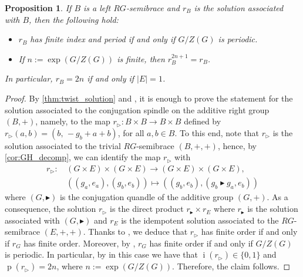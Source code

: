 \documentclass[11pt]{amsart}
\DeclareMathOperator{\ind}{i}
\DeclareMathOperator{\per}{p}
\newcommand{\indd}[1]{\ind{#1}}
\newcommand{\perr}[1]{\per{#1}}
\newtheorem{proposition}[theorem]{Proposition}
\theoremstyle{definition}
\begin{document}
\begin{proposition}
    If $B$ is a left $RG$-semibrace and $r_B$ is the solution associated with $B$, then the following hold:
    \begin{itemize}
        \item[{\rm(1)}] $r_B$ has finite index and period if and only if $G/Z(G)$ is periodic.
        \item[{\rm(2)}] If $n := \exp(G/Z(G))$ is finite, then $r_B^{2n + 1} = r_B$.
    \end{itemize}
    In particular, $r_B = 2n$ if and only if $|E| = 1$.
    \end{proposition}
\begin{proof}
    By \cref{thm:twist_solution} and \cite[Lemma 2.12]{DoRySte24}, it is enough to prove the statement for the solution associated to the conjugation spindle on the additive right group $(B,+)$, namely, to the map $r_\triangleright:B\times B\to B\times B$ defined by $r_\triangleright(a,b) = (b,\, - g_b + a+b)$, for all $a,b\in B$.
    To this end, note that $r_\triangleright$ is the solution associated to the trivial $RG$-semibrace $(B,+,+)$, hence, by \cref{cor:GH_decomp}, we can identify the map $r_\triangleright$ with
    \begin{align*}
        r_\triangleright:\,& (G \times E) \times (G \times E) \to (G \times E) \times (G \times E), \\
        &\left( (g_a,e_a), (g_b,e_b) \right)\mapsto  \left( (g_b,e_b), (g_b \blacktriangleright g_a, e_b) \right)
    \end{align*}
    where $(G,\blacktriangleright)$ is the conjugation quandle of the additive group $(G,+)$.
    As a consequence, the solution $r_\triangleright$ is the direct product $r_{\blacktriangleright} \times r_E$ where $r_\blacktriangleright$ is the solution associated with $(G,\blacktriangleright)$ and $r_E$ is the idempotent solution associated to the $RG$-semibrace $(E,+,+)$.
    Thanks to \cite[Theorem 9]{CCSt20-2}, we deduce that $r_\triangleright$ has finite order if and only if $r_G$ has finite order.
    Moreover, by \cite[Corollary 1.20]{AlSte25}, $r_G$ has finite order if and only if $G/Z(G)$ is periodic.
    In particular, by \cite[Proposition 10]{CCSt20-2} in this case we have that $\indd{\left(r_\triangleright\right)}\in \{0,1\}$ and $\perr{\left(r_\triangleright\right)} = 2n$, where $n := \exp(G/Z(G))$. Therefore, the claim follows.
\end{proof}

\smallskip
\end{document}
